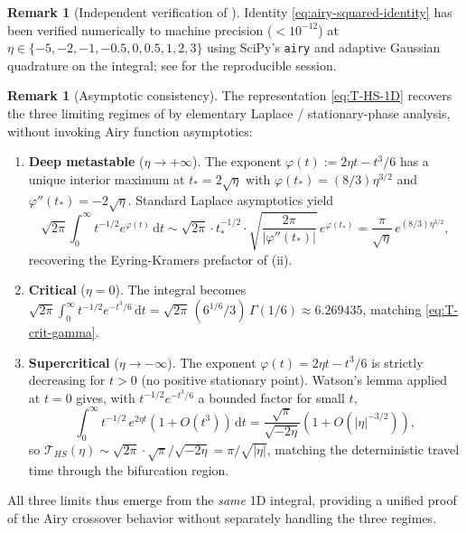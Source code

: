 \documentclass[11pt,a4paper]{article}
\theoremstyle{plain}
\theoremstyle{definition}
\newtheorem{remark}[theorem]{Remark}
\renewcommand{\d}{\mathrm{d}}
\begin{document}
\begin{remark}[Independent verification of ]
Identity \eqref{eq:airy-squared-identity} has been verified numerically to machine precision ($< 10^{-12}$) at $\eta \in \{-5, -2, -1, -0.5, 0, 0.5, 1, 2, 3\}$ using SciPy's \texttt{airy} and adaptive Gaussian quadrature on the integral; see  for the reproducible session.
\end{remark}

\begin{remark}[Asymptotic consistency]\label{rem:asympt-consistency}
The representation \eqref{eq:T-HS-1D} recovers the three limiting regimes of  by elementary Laplace / stationary-phase analysis, without invoking Airy function asymptotics:
\begin{enumerate}
\item \textbf{Deep metastable} ($\eta \to +\infty$). The exponent $\varphi(t) := 2\eta t - t^3/6$ has a unique interior maximum at $t_* = 2\sqrt\eta$ with $\varphi(t_*) = (8/3)\eta^{3/2}$ and $\varphi''(t_*) = -2\sqrt\eta$. Standard Laplace asymptotics yield
$$\sqrt{2\pi}\int_0^\infty t^{-1/2} e^{\varphi(t)}\,\d t \sim \sqrt{2\pi}\cdot t_*^{-1/2}\cdot\sqrt{\frac{2\pi}{|\varphi''(t_*)|}}\,e^{\varphi(t_*)} = \frac{\pi}{\sqrt\eta}\,e^{(8/3)\eta^{3/2}},$$
recovering the Eyring-Kramers prefactor of (ii).
\item \textbf{Critical} ($\eta = 0$). The integral becomes $\sqrt{2\pi}\int_0^\infty t^{-1/2} e^{-t^3/6}\,\d t = \sqrt{2\pi}\,(6^{1/6}/3)\,\Gamma(1/6) \approx 6.269435$, matching \eqref{eq:T-crit-gamma}.
\item \textbf{Supercritical} ($\eta \to -\infty$). The exponent $\varphi(t) = 2\eta t - t^3/6$ is strictly decreasing for $t > 0$ (no positive stationary point). Watson's lemma applied at $t = 0$ gives, with $t^{-1/2} e^{-t^3/6}$ a bounded factor for small $t$,
$$\int_0^\infty t^{-1/2}\,e^{2\eta t}(1 + O(t^3))\,\d t = \frac{\sqrt\pi}{\sqrt{-2\eta}}(1 + O(|\eta|^{-3/2})),$$
so $\mathcal T_{HS}(\eta) \sim \sqrt{2\pi}\cdot \sqrt\pi/\sqrt{-2\eta} = \pi/\sqrt{|\eta|}$, matching the deterministic travel time through the bifurcation region.
\end{enumerate}
All three limits thus emerge from the \emph{same} 1D integral, providing a unified proof of the Airy crossover behavior without separately handling the three regimes.
\end{remark}
\end{document}
